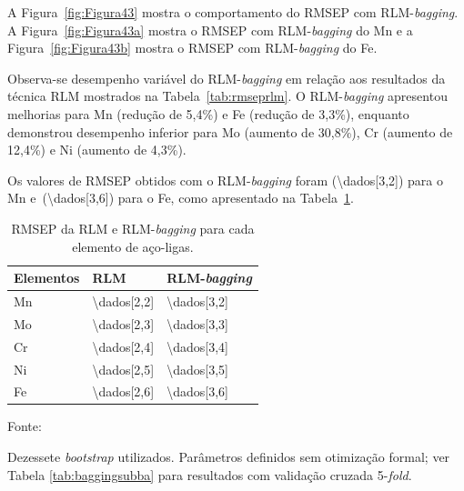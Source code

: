 A Figura~\ref{fig:Figura43} mostra o comportamento do RMSEP com RLM-\textit{bagging}. A Figura~\ref{fig:Figura43a} mostra o RMSEP com RLM-\textit{bagging} do Mn e a Figura~\ref{fig:Figura43b} mostra o RMSEP com RLM-\textit{bagging} do Fe.

Observa-se desempenho variável do RLM-\textit{bagging} em relação aos resultados da técnica RLM mostrados na Tabela~\ref{tab:rmseprlm}. O RLM-\textit{bagging} apresentou melhorias para Mn (redução de 5,4\%) e Fe (redução de 3,3\%), enquanto demonstrou desempenho inferior para Mo (aumento de 30,8\%), Cr (aumento de 12,4\%) e Ni (aumento de 4,3\%).

Os valores de RMSEP obtidos com o RLM-\textit{bagging} foram (\num{\dados[3,2]}) para o Mn e~(\num{\dados[3,6]}) para o Fe, como apresentado na Tabela~\ref{tab:bagging}.




\begin{table}[!htbp]
\centering
\small
\begin{threeparttable}
\caption{RMSEP da RLM e RLM-\textit{bagging} para cada elemento de aço-ligas.}
\label{tab:bagging}
\begin{tabular}{p{3cm} p{4cm} p{4cm}} %
\toprule
\textbf{Elementos} & \textbf{RLM} & \textbf{RLM-\textit{bagging}} \tnote{a} \\ 
\midrule
Mn & \num{\dados[2,2]} & \num{\dados[3,2]} \\ 
Mo & \num{\dados[2,3]} & \num{\dados[3,3]} \\ 
Cr & \num{\dados[2,4]} & \num{\dados[3,4]} \\ 
Ni & \num{\dados[2,5]} & \num{\dados[3,5]} \\ 
Fe & \num{\dados[2,6]} & \num{\dados[3,6]} \\ 
\bottomrule
\end{tabular}

\begin{tablenotes}[flushleft] %
    \footnotesize
    \item \footnotesize{Fonte:~\oautor}
    \item[a] Dezessete \textit{bootstrap} utilizados. Parâmetros definidos sem otimização formal; ver Tabela \ref{tab:baggingsubba} para resultados com validação cruzada 5-\textit{fold}.
\end{tablenotes}
\end{threeparttable}
\end{table}


